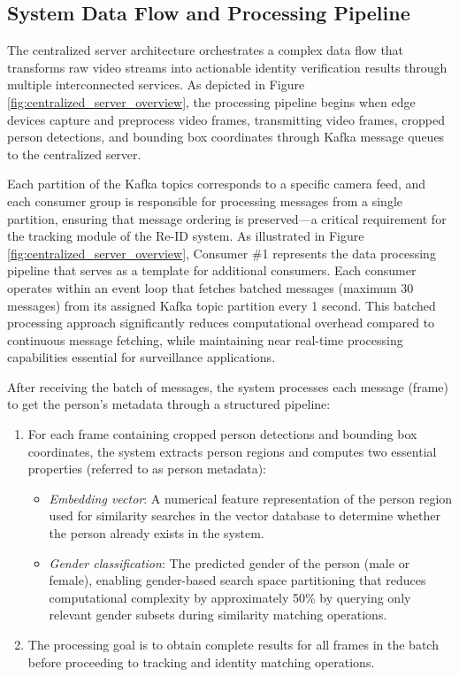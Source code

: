 \subsection{System Data Flow and Processing Pipeline}

The centralized server architecture orchestrates a complex data flow that transforms raw video streams into actionable identity verification results through multiple interconnected services. As depicted in Figure \ref{fig:centralized_server_overview}, the processing pipeline begins when edge devices capture and preprocess video frames, transmitting video frames, cropped person detections, and bounding box coordinates through Kafka message queues to the centralized server.

Each partition of the Kafka topics corresponds to a specific camera feed, and each consumer group is responsible for processing messages from a single partition, ensuring that message ordering is preserved—a critical requirement for the tracking module of the Re-ID system. As illustrated in Figure \ref{fig:centralized_server_overview}, Consumer \#1 represents the data processing pipeline that serves as a template for additional consumers. Each consumer operates within an event loop that fetches batched messages (maximum 30 messages) from its assigned Kafka topic partition every 1 second. This batched processing approach significantly reduces computational overhead compared to continuous message fetching, while maintaining near real-time processing capabilities essential for surveillance applications.

After receiving the batch of messages, the system processes each message (frame) to get the person's metadata through a structured pipeline:

\begin{enumerate}
   \item For each frame containing cropped person detections and bounding box coordinates, the system extracts person regions and computes two essential properties (referred to as person metadata):
   \begin{itemize}
       \item \textit{Embedding vector}: A numerical feature representation of the person region used for similarity searches in the vector database to determine whether the person already exists in the system.
       \item \textit{Gender classification}: The predicted gender of the person (male or female), enabling gender-based search space partitioning that reduces computational complexity by approximately 50\% by querying only relevant gender subsets during similarity matching operations.
   \end{itemize}
   \item The processing goal is to obtain complete results for all frames in the batch before proceeding to tracking and identity matching operations.
\end{enumerate}

